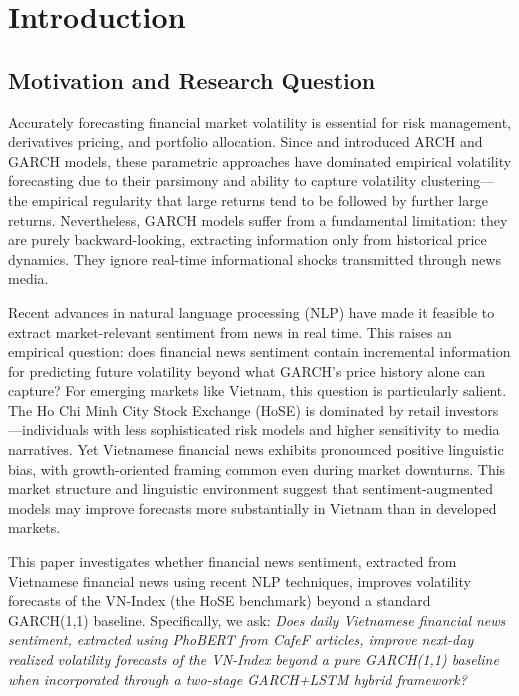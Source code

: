 \section{Introduction}

\subsection{Motivation and Research Question}

Accurately forecasting financial market volatility is essential for risk management, derivatives pricing, and portfolio allocation. Since \citet{engle1982autoregressive} and \citet{bollerslev1986generalized} introduced ARCH and GARCH models, these parametric approaches have dominated empirical volatility forecasting due to their parsimony and ability to capture volatility clustering—the empirical regularity that large returns tend to be followed by further large returns. Nevertheless, GARCH models suffer from a fundamental limitation: they are purely backward-looking, extracting information only from historical price dynamics. They ignore real-time informational shocks transmitted through news media.

Recent advances in natural language processing (NLP) have made it feasible to extract market-relevant sentiment from news in real time. This raises an empirical question: does financial news sentiment contain incremental information for predicting future volatility beyond what GARCH's price history alone can capture? For emerging markets like Vietnam, this question is particularly salient. The Ho Chi Minh City Stock Exchange (HoSE) is dominated by retail investors—individuals with less sophisticated risk models and higher sensitivity to media narratives. Yet Vietnamese financial news exhibits pronounced positive linguistic bias, with growth-oriented framing common even during market downturns. This market structure and linguistic environment suggest that sentiment-augmented models may improve forecasts more substantially in Vietnam than in developed markets.

This paper investigates whether financial news sentiment, extracted from Vietnamese financial news using recent NLP techniques, improves volatility forecasts of the VN-Index (the HoSE benchmark) beyond a standard GARCH(1,1) baseline. Specifically, we ask: \textit{Does daily Vietnamese financial news sentiment, extracted using PhoBERT from CafeF articles, improve next-day realized volatility forecasts of the VN-Index beyond a pure GARCH(1,1) baseline when incorporated through a two-stage GARCH+LSTM hybrid framework?}

